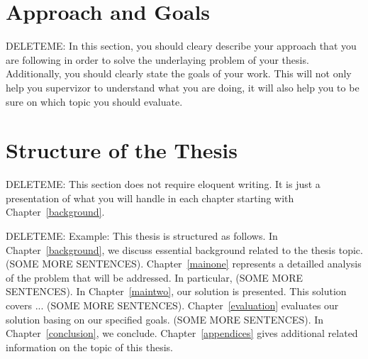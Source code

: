 \section{Approach and Goals}
DELETEME: In this section, you should cleary describe your approach that you are following in order to solve the underlaying problem of your thesis. Additionally, you should clearly state the goals of your work. This will not only help you supervizor to understand what you are doing, it will also help you to be sure on which topic you should evaluate.


\section{Structure of the Thesis}
DELETEME: This section does not require eloquent writing. It is just a presentation of what you will handle in each chapter starting with Chapter~\ref{background}.

DELETEME: Example: This thesis is structured as follows. In Chapter~\ref{background}, we discuss essential background related to the thesis topic. (SOME MORE SENTENCES). Chapter~\ref{mainone} represents a detailled analysis of the problem that will be addressed. In particular, (SOME MORE SENTENCES). In Chapter~\ref{maintwo}, our solution is presented. This solution covers ... (SOME MORE SENTENCES). Chapter~\ref{evaluation} evaluates our solution basing on our specified goals. (SOME MORE SENTENCES). In Chapter~\ref{conclusion}, we conclude. Chapter~\ref{appendices} gives additional related information on the topic of this thesis.